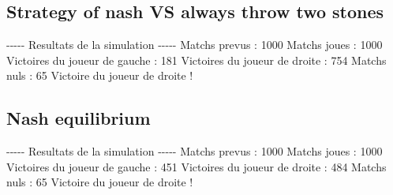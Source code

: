 \documentclass{article}%
\begin{document}
%
\subsection{Strategy of nash VS always throw two stones}%
\label{subsec:Strategy of nash VS always throw two stones}%
{-}{-}{-}{-}{-} Resultats de la simulation {-}{-}{-}{-}{-}\newline%
		\newline%
Matchs prevus : 1000\newline%
Matchs joues : 1000\newline%
\newline%
Victoires du joueur de gauche : 181\newline%
Victoires du joueur de droite : 754\newline%
Matchs nuls : 65\newline%
\newline%
Victoire du joueur de droite !

%
\subsection{Nash equilibrium}%
\label{subsec:Nash equilibrium}%
{-}{-}{-}{-}{-} Resultats de la simulation {-}{-}{-}{-}{-}\newline%
		\newline%
Matchs prevus : 1000\newline%
Matchs joues : 1000\newline%
\newline%
Victoires du joueur de gauche : 451\newline%
Victoires du joueur de droite : 484\newline%
Matchs nuls : 65\newline%
\newline%
Victoire du joueur de droite !

%
\end{document}
